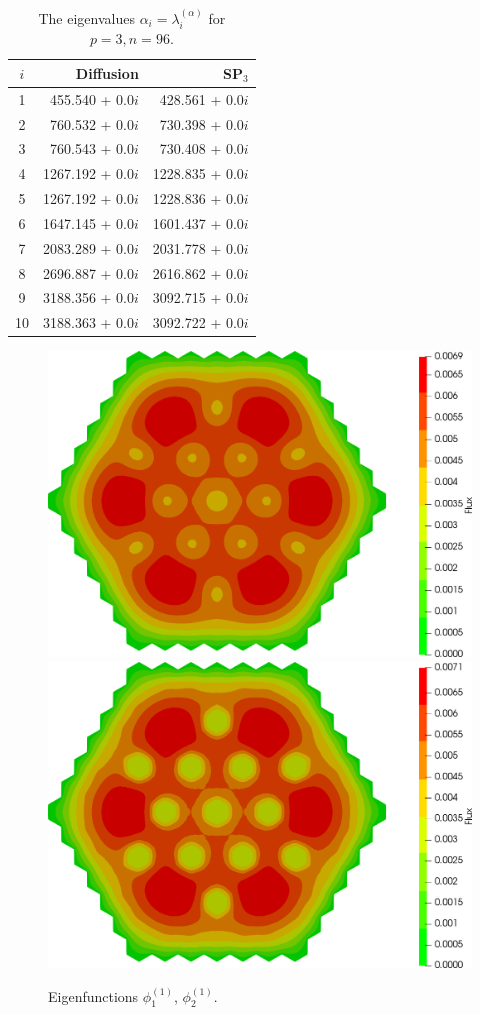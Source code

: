 \documentclass[authoryear]{elsarticle}
\begin{document}
\begin{table}[h]
\caption{The eigenvalues $\alpha_i=\lambda_i^{(\alpha)}$ for $p=3, n=96$.}
\label{tab:iaea_without_alpha_10}
\begin{center}
\begin{tabular}{c r r}
\hline
$i$ & Diffusion & SP$_3$ \\
\hline
1 & 455.540 + 0.0$i$& 428.561 + 0.0$i$ \\
2 & 760.532 + 0.0$i$& 730.398 + 0.0$i$ \\
3 & 760.543 + 0.0$i$& 730.408 + 0.0$i$ \\
4 & 1267.192 + 0.0$i$&1228.835 + 0.0$i$ \\
5 & 1267.192 + 0.0$i$&1228.836 + 0.0$i$ \\
6 & 1647.145 + 0.0$i$&1601.437 + 0.0$i$ \\
7 & 2083.289 + 0.0$i$&2031.778 + 0.0$i$ \\
8 & 2696.887 + 0.0$i$&2616.862 + 0.0$i$ \\
9 & 3188.356 + 0.0$i$&3092.715 + 0.0$i$ \\
10& 3188.363 + 0.0$i$&3092.722 + 0.0$i$ \\
\hline
\end{tabular}
\end{center}
\end{table}

\begin{figure}[h]
\begin{center}
	\includegraphics[width=0.49\linewidth]{iaea_without/alpha_sp3_u1_1_without.png}
	\includegraphics[width=0.49\linewidth]{iaea_without/alpha_sp3_u2_1_without.png}\\
	\caption{Eigenfunctions $\phi_1^{(1)}$, $\phi_2^{(1)}$.}
	\label{fig:iaea_without_fun_1}
\end{center}
\end{figure}
\end{document}
